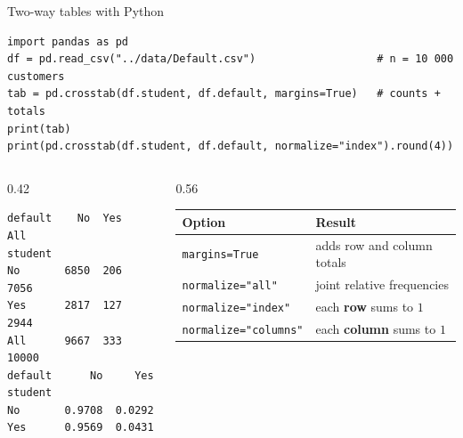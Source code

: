 \documentclass[aspectratio=169,11pt]{beamer}
\begin{document}
\begin{frame}[fragile]{Two-way tables with Python}
\begin{lstlisting}
import pandas as pd
df = pd.read_csv("../data/Default.csv")                   # n = 10 000 customers
tab = pd.crosstab(df.student, df.default, margins=True)   # counts + totals
print(tab)
print(pd.crosstab(df.student, df.default, normalize="index").round(4))
\end{lstlisting}
  \begin{columns}[T]
    \begin{column}{0.42\textwidth}
\begin{lstlisting}[style=Pyout]
default    No  Yes    All
student
No       6850  206   7056
Yes      2817  127   2944
All      9667  333  10000
default      No     Yes
student
No       0.9708  0.0292
Yes      0.9569  0.0431
\end{lstlisting}
    \end{column}
    \begin{column}{0.56\textwidth}
      \small
      \renewcommand{\arraystretch}{1.2}
      \begin{tabular}{@{}ll@{}}
        \toprule
        \textbf{Option} & \textbf{Result}\\
        \midrule
        \texttt{margins=True} & adds row and column totals\\
        \texttt{normalize="all"} & joint relative frequencies\\
        \texttt{normalize="index"} & each \textbf{row} sums to $1$\\
        \texttt{normalize="columns"} & each \textbf{column} sums to $1$\\
        \bottomrule
      \end{tabular}
    \end{column}
  \end{columns}
  \smallskip
\end{frame}
\end{document}
